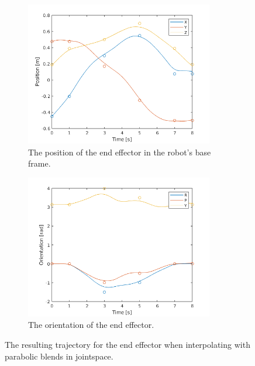 \documentclass[../main.tex]{subfiles}
\begin{document}
\begin{figure}[H]
    \centering
    \begin{subfigure}[t]{0.45\textwidth}
        \centering
        \captionsetup{width=.9\textwidth}
        \includegraphics[width=0.9\textwidth]{figures/p2p_interpolation/d_joint_space_int_with_blend_position.png}
        \caption{The position of the end effector in the robot's base frame.}
        \label{}
    \end{subfigure}
    \begin{subfigure}[t]{0.45\textwidth}
        \centering
        \captionsetup{width=.9\textwidth}
        \includegraphics[width=0.9\textwidth]{figures/p2p_interpolation/d_joint_space_int_with_blend_orientation.png}
        \caption{The orientation of the end effector.}
        \label{}
    \end{subfigure}
    \caption{The resulting trajectory for the end effector when interpolating with parabolic blends in jointspace.}
    \label{fig:p2p_int_blend}
\end{figure}
\end{document}
